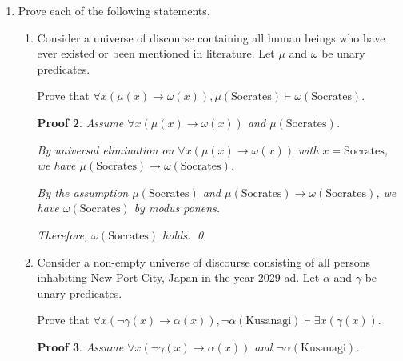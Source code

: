 \documentclass[12pt]{article}
\theoremstyle{proofstyle}
\newtheorem*{proof*}{Proof}
\let\oldquote\quote
\let\oldendquote\endquote
\renewenvironment{quote}
    {\oldquote\setlength{\parskip}{0.2em}}
    {\oldendquote}
\begin{document}
\begin{enumerate}[left=0pt, itemsep=2em, parsep=1em]
\begin{enumerate}[label=(\alph*), itemsep=1.5em, leftmargin=2em]
\begin{proof*}
\begin{quote}
    Thus we have $\neg(\varphi \vee \psi)$.
    
    However, we originally assumed $(\varphi \vee \psi)$.
    
    Thus we have both $(\varphi \vee \psi)$ and $\neg(\varphi \vee \psi)$, which is a contradiction.
    \end{quote}
    
    Therefore, by reductio ad absurdum, $\xi \vee \chi$ holds. \qed
\end{proof*}

\end{enumerate}

\newpage

\item Prove each of the following statements.

\begin{enumerate}[label=(\alph*), itemsep=1.5em, leftmargin=2em]

\item Consider a universe of discourse containing all human beings who have ever existed or been mentioned in literature. Let $\mu$ and $\omega$ be unary predicates.

Prove that $\forall x(\mu(x) \to \omega(x)), \mu(\text{Socrates}) \vdash \omega(\text{Socrates})$.

\begin{proof*}
    Assume $\forall x(\mu(x) \to \omega(x))$ and $\mu(\text{Socrates})$.
    
    By universal elimination on $\forall x(\mu(x) \to \omega(x))$ with $x = \text{Socrates}$, we have $\mu(\text{Socrates}) \to \omega(\text{Socrates})$. 
    
    By the assumption $\mu(\text{Socrates})$ and $\mu(\text{Socrates}) \to \omega(\text{Socrates})$, we have $\omega(\text{Socrates})$ by modus ponens.
    
    Therefore, $\omega(\text{Socrates})$ holds. \qed
\end{proof*}

\item Consider a non-empty universe of discourse consisting of all persons inhabiting New Port City, Japan in the year 2029 ad. Let $\alpha$ and $\gamma$ be unary predicates.

Prove that $\forall x(\neg\gamma(x) \to \alpha(x)), \neg\alpha(\text{Kusanagi}) \vdash \exists x(\gamma(x))$.

\begin{proof*}
    Assume $\forall x(\neg\gamma(x) \to \alpha(x))$ and $\neg\alpha(\text{Kusanagi})$.
    

\end{proof*}
\end{enumerate}
\end{enumerate}
\end{document}
